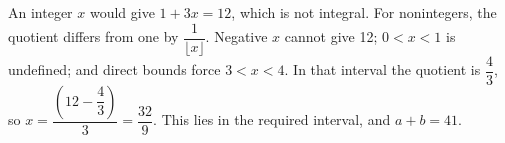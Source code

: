 An integer $x$ would give $1+3x=12$, which is not integral. For nonintegers, the quotient differs from one by $\dfrac{1}{\lfloor x\rfloor}$. Negative $x$ cannot give 12; $0<x<1$ is undefined; and direct bounds force $3<x<4$. In that interval the quotient is $\dfrac{4}{3}$, so $x=\dfrac{(12-\dfrac{4}{3})}{3}=\dfrac{32}{9}$. This lies in the required interval, and $a+b=\boxed{41}$.
